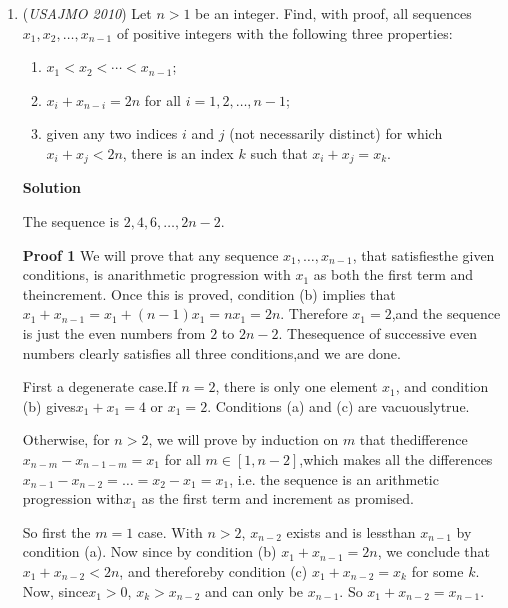 \begin{enumerate}
 


	\item (\textit{USAJMO 2010}) Let $n > 1$ be an integer. Find, with proof, all sequences $x_1, x_2, \ldots, x_{n-1}$ of positive integers with the following three properties:


 
            \begin{enumerate}

        \item  $x_1 < x_2 < \cdots < x_{n-1}$;

        \item  $x_i + x_{n-i} = 2n$ for all $i = 1, 2, \ldots, n - 1$;

        \item  given any two indices $i$ and $j$ (not necessarily distinct) for which $x_i + x_j < 2n$, there is an index $k$ such that $x_i + x_j = x_k$.

            \end{enumerate}
            



\textbf{Solution}

The sequence is $2, 4, 6, \ldots, 2n-2$.

 \textbf{Proof 1} We will prove that any sequence $x_1, \ldots, x_{n-1}$, that satisfiesthe given conditions, is anarithmetic progression with $x_1$ as both the first term and theincrement. Once this is proved, condition (b) implies that$x_1 + x_{n-1} = x_1 + (n-1)x_1 = nx_1 = 2n$. Therefore $x_1 = 2$,and the sequence is just the even numbers from $2$ to $2n-2$. Thesequence of successive even numbers clearly satisfies all three conditions,and we are done.

 First a degenerate case.If $n = 2$, there is only one element $x_1$, and condition (b) gives$x_1 + x_1 = 4$ or $x_1 = 2$. Conditions (a) and (c) are vacuouslytrue.

 Otherwise, for $n > 2$, we will prove by induction on $m$ that thedifference $x_{n-m} - x_{n-1-m} = x_1$ for all $m \in [1, n-2]$,which makes all the differences $x_{n-1} - x_{n-2} = \ldots = x_2 - x_1 = x_1$, i.e. the sequence is an arithmetic progression with$x_1$ as the first term and increment as promised.

 So first the $m=1$ case. With $n > 2$, $x_{n-2}$ exists and is lessthan $x_{n-1}$ by condition (a). Now since by condition (b) $x_1 + x_{n-1} = 2n$, we conclude that $x_1 + x_{n-2} < 2n$, and thereforeby condition (c) $x_1 + x_{n-2} = x_k$ for some $k$.  Now, since$x_1 > 0$, $x_k > x_{n-2}$ and can only be $x_{n-1}$.  So $x_1 + x_{n-2} = x_{n-1}$.


\end{enumerate}
